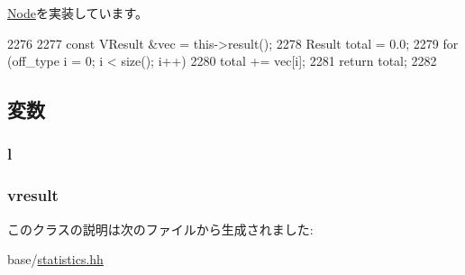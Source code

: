 \hyperlink{classStats_1_1Node_ab152b7e89b37a7db03b04d500ceb8349}{Node}を実装しています。


\begin{DoxyCode}
2276     {
2277         const VResult &vec = this->result();
2278         Result total = 0.0;
2279         for (off_type i = 0; i < size(); i++)
2280             total += vec[i];
2281         return total;
2282     }
\end{DoxyCode}


\subsection{変数}
\hypertarget{classStats_1_1UnaryNode_a6ad7f056f60bd5cfec2caa5d5f4e363f}{
\subsubsection[{l}]{ {\bf l}}}
\label{classStats_1_1UnaryNode_a6ad7f056f60bd5cfec2caa5d5f4e363f}
\hypertarget{classStats_1_1UnaryNode_a8f41af856442757ec68f3391333d3eb2}{
\subsubsection[{vresult}]{ {\bf vresult}}}
\label{classStats_1_1UnaryNode_a8f41af856442757ec68f3391333d3eb2}


このクラスの説明は次のファイルから生成されました:\begin{DoxyCompactItemize}
\item 
base/\hyperlink{statistics_8hh}{statistics.hh}\end{DoxyCompactItemize}
